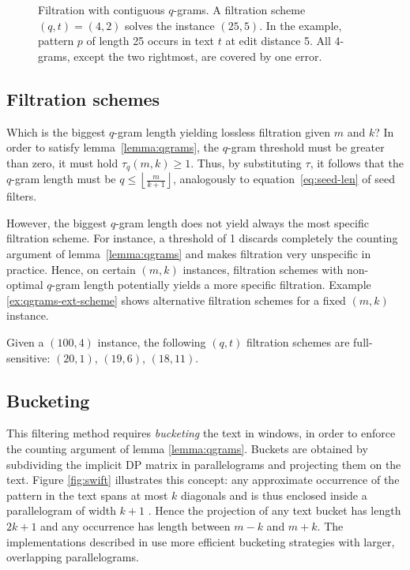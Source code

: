 \begin{figure}[h]
\begin{center}
\caption[Filtration with contiguous $q$-grams]{Filtration with contiguous $q$-grams. A filtration scheme $(q,t) = (4,2)$ solves the instance $(25,5)$. In the example, pattern $p$ of length 25 occurs in text $t$ at edit distance 5. All 4-grams, except the two rightmost, are covered by one error.}
\label{fig:qgrams-ext}

\end{center}
\end{figure}

\subsection{Filtration schemes}

Which is the biggest $q$-gram length yielding lossless filtration given $m$ and $k$?
In order to satisfy lemma~\ref{lemma:qgrams}, the $q$-gram threshold must be greater than zero, \ie it must hold $\tau_q(m,k) \geq 1$.
Thus, by substituting $\tau$, it follows that the $q$-gram length must be $q \leq \left \lfloor \frac{m}{k+1} \right \rfloor$, analogously to equation~\ref{eq:seed-len} of seed filters.

However, the biggest $q$-gram length does not yield always the most specific filtration scheme.
For instance, a threshold of 1 discards completely the counting argument of lemma~\ref{lemma:qgrams} and makes filtration very unspecific in practice.
Hence, on certain $(m,k)$ instances, filtration schemes with non-optimal $q$-gram length potentially yields a more specific filtration.
Example \ref{ex:qgrams-ext-scheme} shows alternative filtration schemes for a fixed $(m,k)$ instance.

\begin{example}
\label{ex:qgrams-ext-scheme}
Given a $(100,4)$ instance, the following $(q,t)$ filtration schemes are full-sensitive:
$(20,1)$, $(19,6)$, $(18,11)$.
\end{example}

\subsection{Bucketing}

This filtering method requires \emph{bucketing} the text in windows, in order to enforce the counting argument of lemma \ref{lemma:qgrams}.
Buckets are obtained by subdividing the implicit DP matrix in parallelograms and projecting them on the text.
Figure \ref{fig:swift} illustrates this concept: any approximate occurrence of the pattern in the text spans at most $k$ diagonals and is thus enclosed inside a parallelogram of width $k+1$ \citep{Rasmussen2006}.
Hence the projection of any text bucket has length $2k + 1$ and any occurrence has length between $m - k$ and $m + k$.
The implementations described in \citep{Rasmussen2006, Kehr2011, Weese2009} use more efficient bucketing strategies with larger, overlapping parallelograms.

